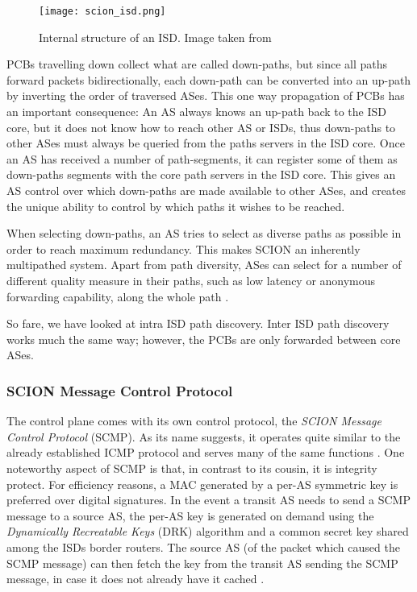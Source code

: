 \documentclass[../eva1_scion.tex]{subfiles}
\begin{document}
    \begin{figure}[ht]
        \centering
        \texttt{[image: scion\_isd.png]}
        \caption{Internal structure of an ISD. Image taken from \cite{scion_2015}}
        \label{fig:isd}
    \end{figure}

    PCBs travelling down collect what are called down-paths, but since all paths forward packets bidirectionally, each down-path can be converted into an up-path by inverting the order of traversed ASes. This one way propagation of PCBs has an important consequence: An AS always knows an up-path back to the ISD core, but it does not know how to reach other AS or ISDs, thus down-paths to other ASes must always be queried from the paths servers in the ISD core. Once an AS has received a number of path-segments, it can register some of them as down-paths segments with the core path servers in the ISD core. This gives an AS control over which down-paths are made available to other ASes, and creates the unique ability to control by which paths it wishes to be reached.

    When selecting down-paths, an AS tries to select as diverse paths as possible in order to reach maximum redundancy. This makes SCION an inherently multipathed system. Apart from path diversity, ASes can select for a number of different quality measure in their paths, such as low latency or anonymous forwarding capability, along the whole path \cite{scion_2011}.

    So fare, we have looked at intra ISD path discovery. Inter ISD path discovery works much the same way; however, the PCBs are only forwarded between core ASes.

    \subsubsection{SCION Message Control Protocol} \label{sssec:scmp}
    The control plane comes with its own control protocol, the \textit{SCION Message Control Protocol} (SCMP). As its name suggests, it operates quite similar to the already established ICMP protocol and serves many of the same functions \cite{scion_2015}. One noteworthy aspect of SCMP is that, in contrast to its cousin, it is integrity protect. For efficiency reasons, a MAC generated by a per-AS symmetric key is preferred over digital signatures. In the event a transit AS needs to send a SCMP message to a source AS, the per-AS key is generated on demand using the \textit{Dynamically Recreatable Keys} (DRK) algorithm and a common secret key shared among the ISDs border routers. The source AS (of the packet which caused the SCMP message) can then fetch the key from the transit AS sending the SCMP message, in case it does not already have it cached \cite{scion_2015}.
\end{document}
